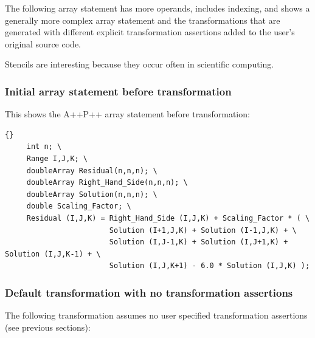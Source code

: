 \documentclass[10pt]{article}
\begin{document}
   The following array statement has more operands, includes indexing, and shows a generally
more complex array statement and the transformations that are generated with different explicit
transformation assertions added to the user's original source code.


   Stencils are interesting because they occur often in scientific computing.

\subsubsection{Initial array statement before transformation}

   This shows the A++\/P++ array statement before transformation:

\vspace{0.5in}

\begin{lstlisting}{}
     int n; \
     Range I,J,K; \
     doubleArray Residual(n,n,n); \
     doubleArray Right_Hand_Side(n,n,n); \
     doubleArray Solution(n,n,n); \
     double Scaling_Factor; \
     Residual (I,J,K) = Right_Hand_Side (I,J,K) + Scaling_Factor * ( \
                        Solution (I+1,J,K) + Solution (I-1,J,K) + \
                        Solution (I,J-1,K) + Solution (I,J+1,K) + Solution (I,J,K-1) + \
                        Solution (I,J,K+1) - 6.0 * Solution (I,J,K) );
\end{lstlisting}


\subsubsection{Default transformation with no transformation assertions}

The following transformation assumes no user specified transformation assertions (see previous sections):
\end{document}
